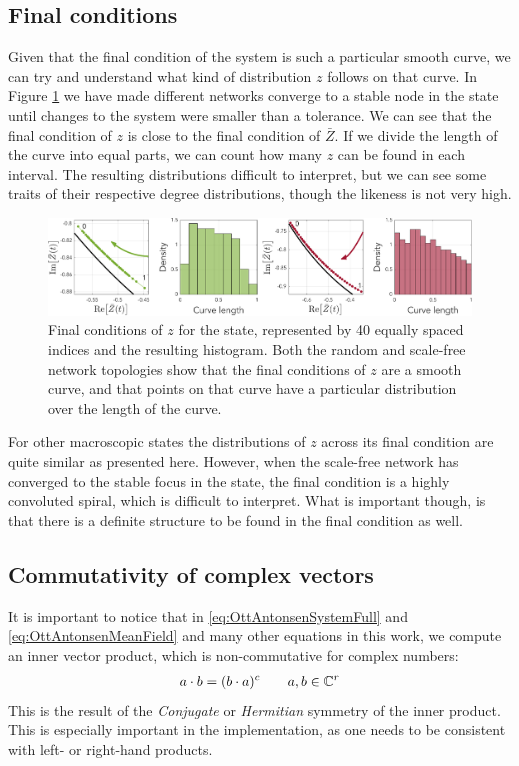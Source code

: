 \subsection{Final conditions}
Given that the final condition of the system is such a particular smooth curve, we can try and understand what kind of distribution $z$ follows on that curve. In Figure \ref{fig:FinalConditions} we have made different networks converge to a stable node in the \PSR state until changes to the system were smaller than a tolerance. We can see that the final condition of $z$ is close to the final condition of $\bar{Z}$. If we divide the length of the curve into equal parts, we can count how many $z$ can be found in each interval. The resulting distributions difficult to interpret, but we can see some traits of their respective degree distributions, though the likeness is not very high. 
\begin{figure}[H]
\centering
\includegraphics[width = \textwidth]{../Figures/Distributions/FinalConditions.pdf}
\caption{Final conditions of $z$ for the \PSR state, represented by 40 equally spaced indices and the resulting histogram. Both the random and scale-free network topologies show that the final conditions of $z$ are a smooth curve, and that points on that curve have a particular distribution over the length of the curve.}
\label{fig:FinalConditions}
\end{figure}

For other macroscopic states the distributions of $z$ across its final condition are quite similar as presented here. However, when the scale-free network has converged to the stable focus in the \PSS state, the final condition is a highly convoluted spiral, which is difficult to interpret. What is important though, is that there is a definite structure to be found in the final condition as well.


\subsection{Commutativity of complex vectors} 
It is important to notice that in \eqref{eq:OttAntonsenSystemFull} and \eqref{eq:OttAntonsenMeanField} and many other equations in this work, we compute an inner vector product, which is non-commutative for complex numbers:
\begin{align}
a \cdot b = (b \cdot a)^c \qquad a, b \in {\mathbb{C}}^r
\end{align}
This is the result of the \textsl{Conjugate} or \textsl{Hermitian} symmetry of the inner product. This is especially important in the implementation, as one needs to be consistent with left- or right-hand products.


